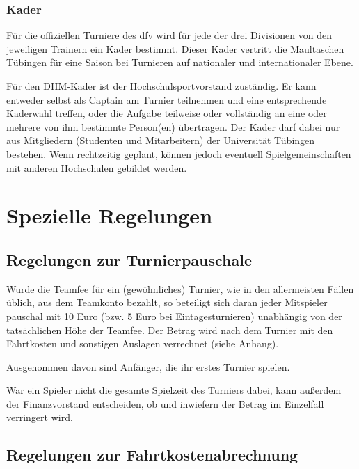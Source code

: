 \documentclass[a4 paper, 11pt]{article}
\begin{document}
\subsubsection{Kader} \label{kader}
Für die offiziellen Turniere des dfv wird für jede der drei Divisionen von den jeweiligen Trainern ein Kader bestimmt. Dieser Kader vertritt die Maultaschen Tübingen für eine Saison bei Turnieren auf nationaler und internationaler Ebene.

Für den DHM-Kader ist der Hochschulsportvorstand zuständig. Er kann entweder selbst als Captain am Turnier teilnehmen und eine entsprechende Kaderwahl treffen, oder die Aufgabe teilweise oder vollständig an eine oder mehrere von ihm bestimmte Person(en) übertragen. Der Kader darf dabei nur aus Mitgliedern (Studenten und Mitarbeitern) der Universität Tübingen bestehen. Wenn rechtzeitig geplant, können jedoch eventuell Spielgemeinschaften mit anderen Hochschulen gebildet werden.


\section{Spezielle Regelungen} \label{speziell}

\subsection{Regelungen zur Turnierpauschale} \label{turnierpauschale}
Wurde die Teamfee für ein (gewöhnliches) Turnier, wie in den allermeisten Fällen üblich, aus dem Teamkonto bezahlt, so beteiligt sich daran jeder Mitspieler pauschal mit 10 Euro (bzw. 5 Euro bei Eintagesturnieren) unabhängig von der tatsächlichen Höhe der Teamfee. Der Betrag wird nach dem Turnier mit den Fahrtkosten und sonstigen Auslagen verrechnet (siehe Anhang). 

Ausgenommen davon sind Anfänger, die ihr erstes Turnier spielen.

War ein Spieler nicht die gesamte Spielzeit des Turniers dabei, kann außerdem der Finanzvorstand entscheiden, ob und inwiefern der Betrag im Einzelfall verringert wird.

\subsection{Regelungen zur Fahrtkostenabrechnung} \label{fahrtkostenabrechnung}
\end{document}
